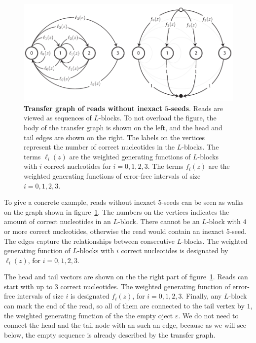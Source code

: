 \documentclass{article}
\begin{document}
\begin{figure}[h]
\centering
\includegraphics[scale=.79]{inexact_graph.pdf}
\caption{\textbf{Transfer graph of reads without inexact $5$-seeds}. Reads
are viewed as sequences of $L$-blocks. To not overload the figure, the
body of the transfer graph is shown on the left, and the head and tail
edges are shown on the right. The labels on the vertices represent the
number of correct nucleotides in the $L$-blocks. The terms $\ell_i(z)$ are
the weighted generating functions of $L$-blocks with $i$ correct
nucleotides for $i = 0,1,2,3$. The terms $f_i(z)$ are the weighted
generating functions of error-free intervals of size $i = 0,1,2,3$.}
\label{fig:inexact_graph}
\end{figure}

To give a concrete example, reads without inexact $5$-seeds can be seen as
walks on the graph shown in figure~\ref{fig:inexact_graph}. The numbers on
the vertices indicates the amount of correct nucleotides in an $L$-block.
There cannot be an $L$-block with $4$ or more correct nucleotides,
otherwise the read would contain an inexact $5$-seed. The edges capture
the relationships between consecutive $L$-blocks. The weighted generating
function of $L$-blocks with $i$ correct nucleotides is designated by
$\ell_i(z)$, for $i = 0, 1, 2, 3$.

The head and tail vectors are shown on the the right part of
figure~\ref{fig:inexact_graph}. Reads can start with up to $3$ correct
nucleotides. The weighted generating function of error-free intervals of
size $i$ is designated $f_i(z)$, for $i = 0, 1, 2, 3$. Finally, any
$L$-block can mark the end of the read, so all of them are connected to
the tail vertex by $1$, the weighted generating function of the the empty
oject $\varepsilon$. We do not need to connect the head and the tail node
with an such an edge, because as we will see below, the empty sequence is
already described by the transfer graph.
\end{document}
